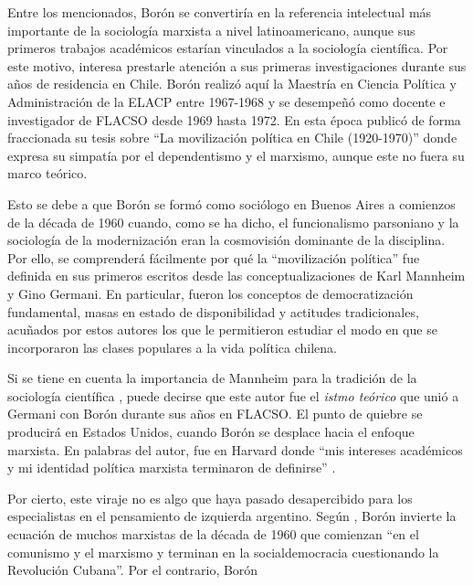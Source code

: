 Entre los mencionados, Borón se convertiría en la referencia intelectual más importante de la sociología marxista a nivel latinoamericano, aunque sus primeros trabajos académicos estarían vinculados a la sociología científica. Por este motivo, interesa prestarle atención a sus primeras investigaciones durante sus años de residencia en Chile. Borón realizó aquí la Maestría en Ciencia Política y Administración de la ELACP entre 1967-1968 y se desempeñó como docente e investigador de FLACSO desde 1969 hasta 1972. En esta época publicó de forma fraccionada su tesis sobre \enquote{La movilización política en Chile (1920-1970)} donde expresa su simpatía por el dependentismo y el marxismo, aunque este no fuera su marco teórico.

Esto se debe a que Borón se formó como sociólogo en Buenos Aires a comienzos de la década de 1960 cuando, como se ha dicho, el funcionalismo parsoniano y la sociología de la modernización eran la cosmovisión dominante de la disciplina. Por ello, se comprenderá fácilmente por qué la \enquote{movilización política} fue definida en sus primeros escritos desde las conceptualizaciones de Karl Mannheim y Gino Germani. En particular, fueron los conceptos de democratización fundamental, masas en estado de disponibilidad y actitudes tradicionales, acuñados por estos autores los que le permitieron estudiar el modo en que se incorporaron las clases populares a la vida política chilena.

Si se tiene en cuenta la importancia de Mannheim para la tradición de la sociología científica \parencite{278-AMARAL2018,1504-VILA2023,1565-BLANCO2006}, puede decirse que este autor fue el \emph{istmo teórico} que unió a Germani con Borón durante sus años en FLACSO. El punto de quiebre se producirá en Estados Unidos, cuando Borón se desplace hacia el enfoque marxista. En palabras del autor, fue en Harvard donde \enquote{mis intereses académicos y mi identidad política marxista terminaron de definirse} \parencite[69]{1568-BORON2020}.

Por cierto, este viraje no es algo que haya pasado desapercibido para los especialistas en el pensamiento de izquierda argentino. Según \textcite[57]{1689-KOHAN2015}, Borón invierte la ecuación de muchos marxistas de la década de 1960 que comienzan \enquote{en el comunismo y el marxismo y terminan en la socialdemocracia cuestionando la Revolución Cubana}. Por el contrario, Borón

